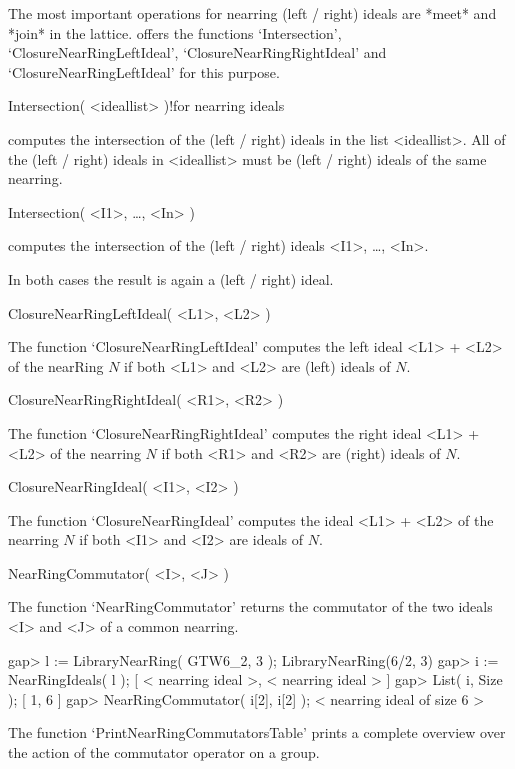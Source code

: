 

The most important operations for nearring (left / right) ideals are *meet*
and *join* in the lattice. {\GAP} offers the functions `Intersection',
`Closure\-NearRing\-LeftIdeal', `Closure\-NearRing\-RightIdeal' and
`Closure\-NearRing\-LeftIdeal' for this purpose.

\>Intersection( <ideallist> )!{for nearring ideals}

computes the intersection of the (left / right) ideals in the list <ideallist>.
All of the (left / right) ideals in <ideallist> must be (left / right) ideals
of the same nearring.

\>Intersection( <I1>, \dots, <In> )

computes the intersection of the (left / right) ideals <I1>, \dots, <In>.

In both cases the result is again a (left / right) ideal.

\>ClosureNearRingLeftIdeal( <L1>, <L2> )

The function `ClosureNearRingLeftIdeal' computes the left ideal <L1> + <L2>
of the nearRing $N$ if both <L1> and <L2> are (left) ideals of $N$.

\>ClosureNearRingRightIdeal( <R1>, <R2> )

The function `ClosureNearRingRightIdeal' computes the right ideal <L1> + <L2>
of the nearring $N$ if both <R1> and <R2> are (right) ideals of $N$.

\>ClosureNearRingIdeal( <I1>, <I2> )

The function `ClosureNearRingIdeal' computes the ideal <L1> + <L2>
of the nearring $N$ if both <I1> and <I2> are ideals of $N$.



\>NearRingCommutator( <I>, <J> )

The function `NearRingCommutator' returns the commutator of the two
ideals <I> and <J> of a common nearring.

\beginexample
    gap> l := LibraryNearRing( GTW6_2, 3 );
    LibraryNearRing(6/2, 3)
    gap> i := NearRingIdeals( l );               
    [ < nearring ideal >, < nearring ideal > ]
    gap> List( i, Size );
    [ 1, 6 ]
    gap> NearRingCommutator( i[2], i[2] );
    < nearring ideal of size 6 >
\endexample

The function `PrintNearRingCommutatorsTable' prints a complete overview
over the action of the commutator operator on a group.

